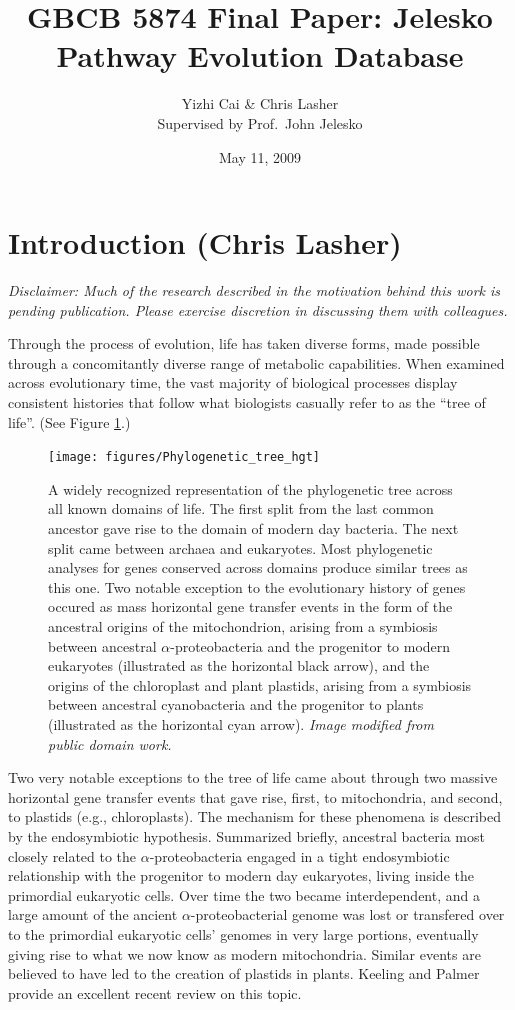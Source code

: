 \documentclass[11pt,letterpaper,twoside,english]{article}
\author{Yizhi Cai \& Chris Lasher\\
Supervised by Prof.~John Jelesko}
\title{GBCB 5874 Final Paper: Jelesko Pathway Evolution Database}
\date{May 11, 2009}
\begin{document}
\maketitle

\section{Introduction (Chris Lasher)}

\textit{Disclaimer: Much of the research described in the motivation behind
this work is pending publication. Please exercise discretion in discussing
them with colleagues.}

Through the process of evolution, life has taken diverse forms, made possible
through a concomitantly diverse range of metabolic capabilities. When examined
across evolutionary time, the vast majority of biological processes display
consistent histories that follow what biologists casually refer to as the
``tree of life''. (See Figure \ref{fig:tree_of_life}.)

\begin{figure}[htbp]
    \begin{center}
        \texttt{[image: figures/Phylogenetic\_tree\_hgt]}
    \end{center}
    \caption{A widely recognized representation of the phylogenetic tree
    across all known domains of life. The first split from the last common
    ancestor gave rise to the domain of modern day bacteria. The next split
    came between archaea and eukaryotes. Most phylogenetic analyses for genes
    conserved across domains produce similar trees as this one. Two notable
    exception to the evolutionary history of genes occured as mass horizontal
    gene transfer events in the form of the ancestral origins of the
    mitochondrion, arising from a symbiosis between ancestral
    $\alpha$-proteobacteria and the progenitor to modern eukaryotes
    (illustrated as the horizontal black arrow), and the origins of the
    chloroplast and plant plastids, arising from a symbiosis between ancestral
    cyanobacteria and the progenitor to plants (illustrated as the horizontal
    cyan arrow). \textit{Image modified from public domain work.}}
    \label{fig:tree_of_life}
\end{figure}

Two very notable exceptions to the tree of life came about through two massive
horizontal gene transfer events that gave rise, first, to mitochondria, and
second, to plastids (e.g., chloroplasts). The mechanism for these phenomena is
described by the endosymbiotic hypothesis. Summarized briefly, ancestral
bacteria most closely related to the $\alpha$-proteobacteria engaged in a
tight endosymbiotic relationship with the progenitor to modern day eukaryotes,
living inside the primordial eukaryotic cells. Over time the two became
interdependent, and a large amount of the ancient $\alpha$-proteobacterial
genome was lost or transfered over to the primordial eukaryotic cells' genomes
in very large portions, eventually giving rise to what we now know as modern
mitochondria. Similar events are believed to have led to the creation of
plastids in plants. Keeling and Palmer \cite{keeling_horizontal_2008} provide
an excellent recent review on this topic.
\end{document}
